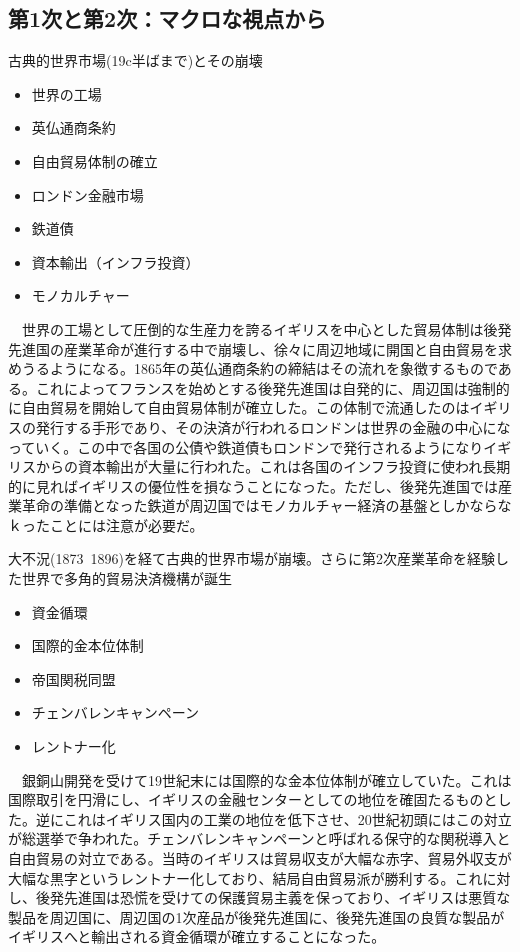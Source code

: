 \documentclass{jsarticle}
\begin{document}
\subsection{第1次と第2次：マクロな視点から}
古典的世界市場(19c半ばまで)とその崩壊
\begin{itemize}
\item 世界の工場
\item 英仏通商条約
\item 自由貿易体制の確立
\item ロンドン金融市場
\item 鉄道債
\item 資本輸出（インフラ投資）
\item モノカルチャー
\end{itemize}
　世界の工場として圧倒的な生産力を誇るイギリスを中心とした貿易体制は後発先進国の産業革命が進行する中で崩壊し、徐々に周辺地域に開国と自由貿易を求めうるようになる。1865年の英仏通商条約の締結はその流れを象徴するものである。これによってフランスを始めとする後発先進国は自発的に、周辺国は強制的に自由貿易を開始して自由貿易体制が確立した。この体制で流通したのはイギリスの発行する手形であり、その決済が行われるロンドンは世界の金融の中心になっていく。この中で各国の公債や鉄道債もロンドンで発行されるようになりイギリスからの資本輸出が大量に行われた。これは各国のインフラ投資に使われ長期的に見ればイギリスの優位性を損なうことになった。ただし、後発先進国では産業革命の準備となった鉄道が周辺国ではモノカルチャー経済の基盤としかならなｋったことには注意が必要だ。

大不況(1873~1896)を経て古典的世界市場が崩壊。さらに第2次産業革命を経験した世界で多角的貿易決済機構が誕生
\begin{itemize}
\item 資金循環
\item 国際的金本位体制
\item 帝国関税同盟
\item チェンバレンキャンペーン
\item レントナー化
\end{itemize}
　銀銅山開発を受けて19世紀末には国際的な金本位体制が確立していた。これは国際取引を円滑にし、イギリスの金融センターとしての地位を確固たるものとした。逆にこれはイギリス国内の工業の地位を低下させ、20世紀初頭にはこの対立が総選挙で争われた。チェンバレンキャンペーンと呼ばれる保守的な関税導入と自由貿易の対立である。当時のイギリスは貿易収支が大幅な赤字、貿易外収支が大幅な黒字というレントナー化しており、結局自由貿易派が勝利する。これに対し、後発先進国は恐慌を受けての保護貿易主義を保っており、イギリスは悪質な製品を周辺国に、周辺国の1次産品が後発先進国に、後発先進国の良質な製品がイギリスへと輸出される資金循環が確立することになった。
\end{document}
